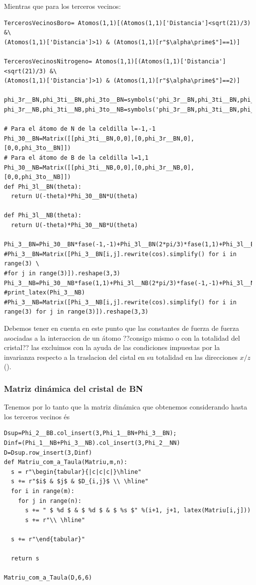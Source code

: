 \documentclass[12pt,a4paper]{article}
\begin{document}
\newpage

Mientras que para los terceros vecinos:
\begin{verbatim}
TercerosVecinosBoro= Atomos(1,1)[(Atomos(1,1)['Distancia']<sqrt(21)/3) &\
(Atomos(1,1)['Distancia']>1) & (Atomos(1,1)[r"$\alpha\prime$"]==1)]

TercerosVecinosNitrogeno= Atomos(1,1)[(Atomos(1,1)['Distancia']<sqrt(21)/3) &\
(Atomos(1,1)['Distancia']>1) & (Atomos(1,1)[r"$\alpha\prime$"]==2)]

phi_3r__BN,phi_3ti__BN,phi_3to__BN=symbols('phi_3r__BN,phi_3ti__BN,phi_3to__BN')
phi_3r__NB,phi_3ti__NB,phi_3to__NB=symbols('phi_3r__BN,phi_3ti__BN,phi_3to__BN')

# Para el átomo de N de la celdilla l=-1,-1  
Phi_30__BN=Matrix([[phi_3ti__BN,0,0],[0,phi_3r__BN,0],[0,0,phi_3to__BN]])
# Para el átomo de B de la celdilla l=1,1
Phi_30__NB=Matrix([[phi_3ti__NB,0,0],[0,phi_3r__NB,0],[0,0,phi_3to__NB]])
def Phi_3l__BN(theta):
  return U(-theta)*Phi_30__BN*U(theta)

def Phi_3l__NB(theta):
  return U(-theta)*Phi_30__NB*U(theta)

Phi_3__BN=Phi_30__BN*fase(-1,-1)+Phi_3l__BN(2*pi/3)*fase(1,1)+Phi_3l__BN(-2*pi/3)*fase(-1,1)
#Phi_3__BN=Matrix([Phi_3__BN[i,j].rewrite(cos).simplify() for i in range(3) \
#for j in range(3)]).reshape(3,3)
Phi_3__NB=Phi_30__NB*fase(1,1)+Phi_3l__NB(2*pi/3)*fase(-1,-1)+Phi_3l__NB(-2*pi/3)*fase(1,-1)
#print_latex(Phi_3__NB)
#Phi_3__NB=Matrix([Phi_3__NB[i,j].rewrite(cos).simplify() for i in range(3) for j in range(3)]).reshape(3,3)
\end{verbatim}

Debemos tener en cuenta en este punto que las  constantes de fuerza de fuerza asociadas a la interaccion de un átomo \color{red}??consigo mismo o con la totalidad del cristal?? \normalcolor las excluimos con la ayuda de las condiciones impuestas por la invarianza respecto a la traslacion del cistal en su totalidad en las direcciones \(x/z\) (\cite{falkovsky08_symmet_const_phonon_disper_graph}).


\subsubsection{Matriz dinámica del cristal de BN}
\label{sec:orgb2cef6c}

Tenemos por lo tanto que la matriz dinámica que obtenemos considerando hasta los terceros vecinos és
\begin{verbatim}
Dsup=Phi_2__BB.col_insert(3,Phi_1__BN+Phi_3__BN);
Dinf=(Phi_1__NB+Phi_3__NB).col_insert(3,Phi_2__NN)
D=Dsup.row_insert(3,Dinf)
def Matriu_com_a_Taula(Matriu,m,n):
  s = r"\begin{tabular}{|c|c|c|}\hline"
  s += r"$i$ & $j$ & $D_{i,j}$ \\ \hline"
  for i in range(m):
    for j in range(n):
      s += " $ %d $ & $ %d $ & $ %s $" %(i+1, j+1, latex(Matriu[i,j]))
      s += r"\\ \hline"

  s += r"\end{tabular}"

  return s

Matriu_com_a_Taula(D,6,6)
\end{verbatim}
\end{document}
